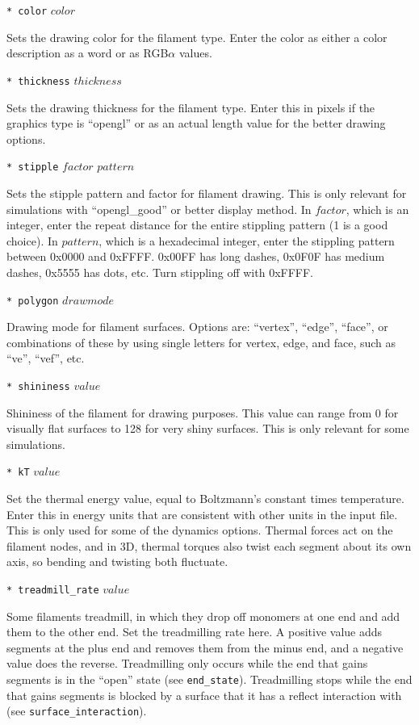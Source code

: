 \documentclass {scrbook}
\newcommand {\ttt} {\texttt}
\begin{document}
\begin{description}
\item{\ttt{* color} $color$}

Sets the drawing color for the filament type. Enter the color as either a color description as a word or as RGB$\alpha$ values.

\item{\ttt{* thickness} $thickness$}

Sets the drawing thickness for the filament type. Enter this in pixels if the graphics type is ``opengl'' or as an actual length value for the better drawing options.

\item{\ttt{* stipple} $factor$ $pattern$}

Sets the stipple pattern and factor for filament drawing. This is only relevant for simulations with ``opengl\_good'' or better display method. In $factor$, which is an integer, enter the repeat distance for the entire stippling pattern (1 is a good choice). In $pattern$, which is a hexadecimal integer, enter the stippling pattern between 0x0000 and 0xFFFF. 0x00FF has long dashes, 0x0F0F has medium dashes, 0x5555 has dots, etc. Turn stippling off with 0xFFFF.

\item{\ttt{* polygon} $drawmode$}

Drawing mode for filament surfaces. Options are: ``vertex'', ``edge'', ``face'', or combinations of these by using single letters for vertex, edge, and face, such as ``ve'', ``vef'', etc.

\item{\ttt{* shininess} $value$}

Shininess of the filament for drawing purposes. This value can range from 0 for visually flat surfaces to 128 for very shiny surfaces. This is only relevant for some simulations.

\item{\ttt{* kT} $value$}

Set the thermal energy value, equal to Boltzmann's constant times temperature. Enter this in energy units that are consistent with other units in the input file. This is only used for some of the dynamics options. Thermal forces act on the filament nodes, and in 3D, thermal torques also twist each segment about its own axis, so bending and twisting both fluctuate.

\item{\ttt{* treadmill\_rate} $value$}

Some filaments treadmill, in which they drop off monomers at one end and add them to the other end. Set the treadmilling rate here. A positive value adds segments at the plus end and removes them from the minus end, and a negative value does the reverse. Treadmilling only occurs while the end that gains segments is in the ``open'' state (see \ttt{end\_state}). Treadmilling stops while the end that gains segments is blocked by a surface that it has a reflect interaction with (see \ttt{surface\_interaction}).


\end{description}
\end{document}
